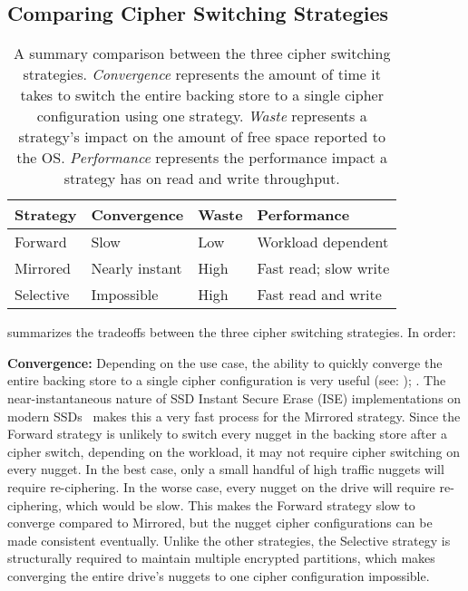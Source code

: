 \subsection{Comparing Cipher Switching Strategies}

\begin{table}[]
   \begin{tabular}{@{}|l|l|l|l|@{}}
      \toprule
      \textbf{Strategy} & \textbf{Convergence} & \textbf{Waste} & \textbf{Performance} \\ \midrule
      Forward   & Slow           & Low  & Workload dependent    \\
      \hline
      Mirrored  & Nearly instant & High & Fast read; slow write \\
      \hline
      Selective & Impossible     & High & Fast read and write   \\
      \hline
   \end{tabular}
   \caption{A summary comparison between the three cipher switching strategies.
   \emph{Convergence} represents the amount of time it takes to switch the
   entire backing store to a single cipher configuration using one strategy.
   \emph{Waste} represents a strategy's impact on the amount of free space
   reported to the OS. \emph{Performance} represents the performance impact a
   strategy has on read and write throughput.}
   \label{tbl:strategies-advantages}
\end{table}

 summarizes the tradeoffs between the three cipher
switching strategies. In order:

\textbf{Convergence:} Depending on the use case, the ability to quickly
converge the entire backing store to a single cipher configuration is very
useful (see: ); . The near-instantaneous nature
of SSD Instant Secure Erase (ISE) implementations on modern
SSDs~\cite{ISE1,ISE2,ISE3} makes this a very fast process for the Mirrored
strategy. Since the Forward strategy is unlikely to switch every nugget in the
backing store after a cipher switch, depending on the workload, it may not
require cipher switching on every nugget. In the best case, only a small handful
of high traffic nuggets will require re-ciphering. In the worse case, every
nugget on the drive will require re-ciphering, which would be slow. This makes
the Forward strategy slow to converge compared to Mirrored, but the nugget
cipher configurations can be made consistent eventually. Unlike the other
strategies, the Selective strategy is structurally required to maintain multiple
encrypted partitions, which makes converging the entire drive's nuggets to one
cipher configuration impossible.

